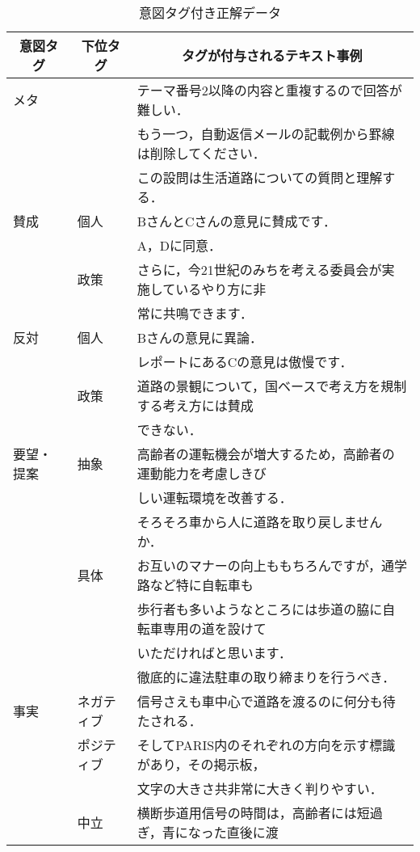 \begin{table}[t]
\begin{center}
\leavevmode
\caption{意図タグ付き正解データ}
\label{tab:data_collection}
\begin{tabular}{|l|l|l|}
\hline
\multicolumn{1}{|c|}{意図タグ}
&\multicolumn{1}{c|}{下位タグ}
&\multicolumn{1}{c|}{タグが付与されるテキスト事例} \\ \hline \hline
メタ
& &テーマ番号2以降の内容と重複するので回答が難しい． \\ \cline{3-3}
& &もう一つ，自動返信メールの記載例から罫線は削除してください． \\ \cline{3-3}
& &この設問は生活道路についての質問と理解する． \\ \hline
賛成
&個人 &BさんとCさんの意見に賛成です． \\ \cline{3-3}
&     &A，Dに同意． \\ \cline{2-3}
&政策 &さらに，今21世紀のみちを考える委員会が実施しているやり方に非\\
&     &常に共鳴できます． \\ \hline
反対
&個人 &Bさんの意見に異論． \\ \cline{3-3}
&     &レポートにあるCの意見は傲慢です． \\ \cline{2-3}
&政策 &道路の景観について，国ベースで考え方を規制する考え方には賛成\\
&     &できない． \\ \hline
要望・提案
&抽象 &高齢者の運転機会が増大するため，高齢者の運動能力を考慮しきび\\
&     &しい運転環境を改善する． \\ \cline{3-3}
&     &そろそろ車から人に道路を取り戻しませんか． \\ \cline{2-3}
&具体 &お互いのマナーの向上ももちろんですが，通学路など特に自転車も\\
&     &歩行者も多いようなところには歩道の脇に自転車専用の道を設けて\\
&     &いただければと思います． \\ \cline{3-3}
&     &徹底的に違法駐車の取り締まりを行うべき． \\ \hline
事実
&ネガティブ &信号さえも車中心で道路を渡るのに何分も待たされる．\\ \cline{2-3}
&ポジティブ &そしてPARIS内のそれぞれの方向を示す標識があり，その掲示板，\\
&           &文字の大きさ共非常に大きく判りやすい． \\ \cline{2-3}
&中立 &横断歩道用信号の時間は，高齢者には短過ぎ，青になった直後に渡\\

\end{tabular}
\end{center}
\end{table}
